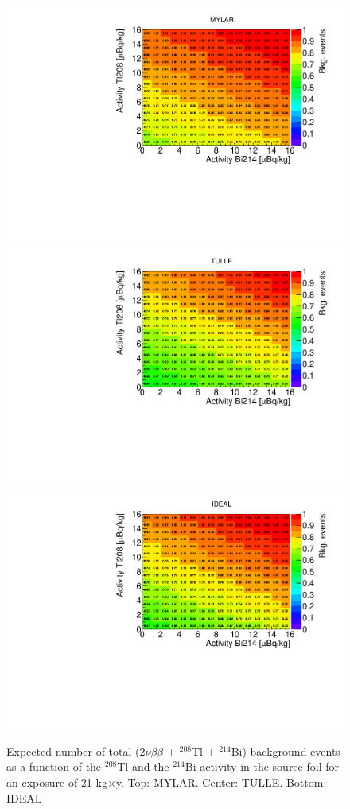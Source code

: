 \documentclass[main.tex]{subfiles}
\begin{document}
\begin{figure}[h!]
\centering
\includegraphics[scale=0.5]{pictures/Chap4/MYLAR_all.pdf}
\includegraphics[scale=0.5]{pictures/Chap4/TULLE_all.pdf}
\includegraphics[scale=0.5]{pictures/Chap4/IDEAL_all.pdf}
\caption{Expected number of total (2$\nu\beta\beta$ + $^{\text{208}}$Tl + $^{\text{214}}$Bi) background events as a function of the $^{\text{208}}$Tl and the $^{\text{214}}$Bi activity in the source foil for an exposure of 21 kg$\times$y. Top: MYLAR. Center: TULLE. Bottom: IDEAL}
\label{Nbkg_3designsTl208Bi214}
\end{figure}
\end{document}
